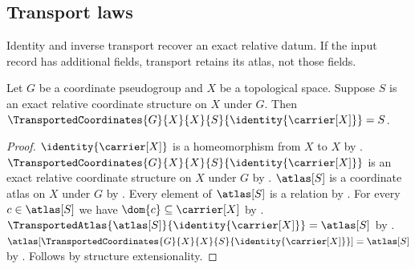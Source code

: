 \subsection{Transport laws}

Identity and inverse transport recover an exact relative datum. If the input
record has additional fields, transport retains its atlas, not those fields.

\begin{theorem}\label{transported_coordinates_identity}
    Let $G$ be a coordinate pseudogroup and $X$ be a topological space.
    Suppose $S$ is an exact relative coordinate structure on $X$ under $G$.
    Then $\TransportedCoordinates{G}{X}{X}{S}{\identity{\carrier[X]}}=S$.
\end{theorem}
\begin{proof}
    $\identity{\carrier[X]}$ is a homeomorphism from $X$ to $X$ by .
    $\TransportedCoordinates{G}{X}{X}{S}{\identity{\carrier[X]}}$ is an exact relative coordinate structure
        on $X$ under $G$ by .
    $\atlas[S]$ is a coordinate atlas on $X$ under $G$ by
        .
    Every element of $\atlas[S]$ is a relation by
        .
    For every $c\in\atlas[S]$ we have $\dom{c}\subseteq\carrier[X]$ by
        .
    $\TransportedAtlas{\atlas[S]}{\identity{\carrier[X]}}=\atlas[S]$ by
        .
    $\atlas[\TransportedCoordinates{G}{X}{X}{S}{\identity{\carrier[X]}}]=\atlas[S]$ by
        .
    Follows by structure extensionality.
\end{proof}

